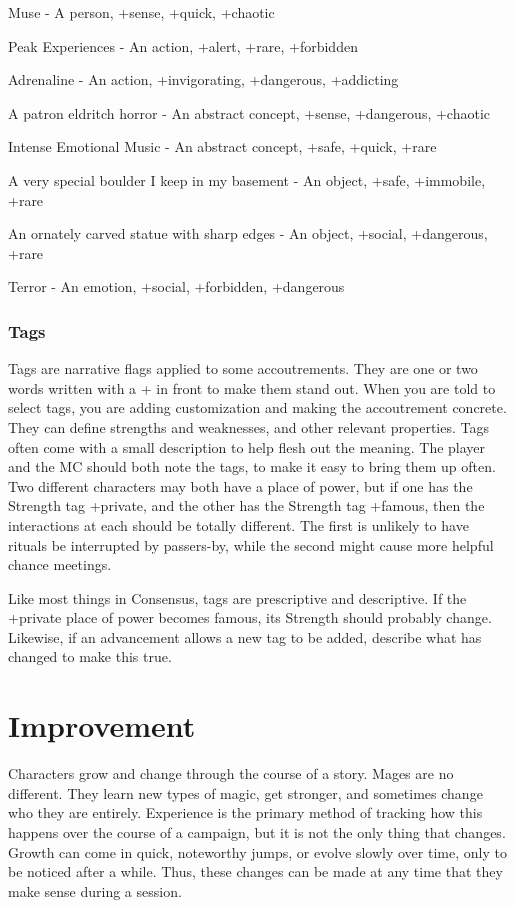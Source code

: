 \documentclass[
  oneside,
  statementpaper,
  9pt]{memoir}
\begin{document}
Muse - A person, +sense, +quick, +chaotic

Peak Experiences - An action, +alert, +rare, +forbidden

Adrenaline - An action, +invigorating, +dangerous, +addicting

A patron eldritch horror - An abstract concept, +sense, +dangerous,
+chaotic

Intense Emotional Music - An abstract concept, +safe, +quick, +rare

A very special boulder I keep in my basement - An object, +safe,
+immobile, +rare

An ornately carved statue with sharp edges - An object, +social,
+dangerous, +rare

Terror - An emotion, +social, +forbidden, +dangerous

\hypertarget{tags}{%
\subsection{Tags}\label{tags}}

Tags are narrative flags applied to some accoutrements. They are one or
two words written with a + in front to make them stand out. When you are
told to select tags, you are adding customization and making the
accoutrement concrete. They can define strengths and weaknesses, and
other relevant properties. Tags often come with a small description to
help flesh out the meaning. The player and the MC should both note the
tags, to make it easy to bring them up often. Two different characters
may both have a place of power, but if one has the Strength tag
+private, and the other has the Strength tag +famous, then the
interactions at each should be totally different. The first is unlikely
to have rituals be interrupted by passers-by, while the second might
cause more helpful chance meetings.

Like most things in Consensus, tags are prescriptive and descriptive. If
the +private place of power becomes famous, its Strength should probably
change. Likewise, if an advancement allows a new tag to be added,
describe what has changed to make this true.

\newpage

\hypertarget{improvement-1}{%
\chapter{Improvement}\label{improvement-1}}

Characters grow and change through the course of a story. Mages are no
different. They learn new types of magic, get stronger, and sometimes
change who they are entirely. Experience is the primary method of
tracking how this happens over the course of a campaign, but it is not
the only thing that changes. Growth can come in quick, noteworthy jumps,
or evolve slowly over time, only to be noticed after a while. Thus,
these changes can be made at any time that they make sense during a
session.
\end{document}
